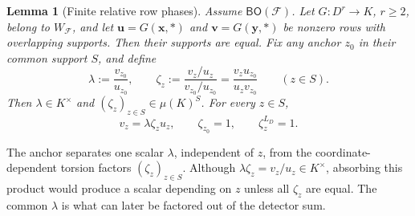 \documentclass[11pt]{article}
\theoremstyle{plain}
\newtheorem{lemma}[lemma]{Lemma}
\theoremstyle{definition}
\theoremstyle{remark}
\newcommand{\cF}{\mathcal F}
\newcommand{\BO}{\mathsf{BO}}
\begin{document}
\begin{lemma}[Finite relative row phases]
\label{lem:finite-row-phases}
Assume $\BO(\cF)$.  Let $G:D^r\to K$, $r\ge2$, belong to $W_{\cF}$, and
let $\mathbf u=G(\mathbf x,\ast)$ and
$\mathbf v=G(\mathbf y,\ast)$ be nonzero rows with overlapping supports.
Then their supports are equal.  Fix any anchor $z_0$ in their common support
$S$, and define
\begin{equation}
  \lambda:=\frac{v_{z_0}}{u_{z_0}},
  \qquad
  \zeta_z:=
    \frac{v_z/u_z}{v_{z_0}/u_{z_0}}
    =\frac{v_zu_{z_0}}{u_zv_{z_0}}
  \qquad(z\in S).
  \label{eq:anchored-row-phases}
\end{equation}
Then $\lambda\in K^\times$ and
$(\zeta_z)_{z\in S}\in\mu(K)^S$.  For every $z\in S$,
\begin{equation}
  v_z=\lambda\zeta_z u_z,
  \qquad
  \zeta_{z_0}=1,
  \qquad
  \zeta_z^{L_D}=1.
  \label{eq:finite-row-phases}
\end{equation}
\end{lemma}

The anchor separates one scalar $\lambda$, independent of $z$, from the
coordinate-dependent torsion factors $(\zeta_z)_{z\in S}$.  Although
$\lambda\zeta_z=v_z/u_z\in K^\times$, absorbing this product would produce
a scalar depending on $z$ unless all $\zeta_z$ are equal.  The common
$\lambda$ is what can later be factored out of the detector sum.
\end{document}
